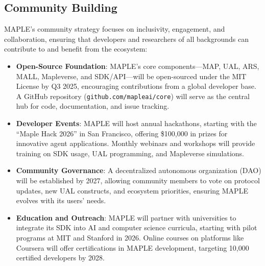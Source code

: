 \documentclass[a4paper,11pt]{article}
\begin{document}
\subsection{Community Building}
MAPLE’s community strategy focuses on inclusivity, engagement, and collaboration, ensuring that developers and researchers of all backgrounds can contribute to and benefit from the ecosystem:
\begin{itemize}[leftmargin=*]
    \item \textbf{Open-Source Foundation}: MAPLE’s core components—MAP, UAL, ARS, MALL, Mapleverse, and SDK/API—will be open-sourced under the MIT License by Q3 2025, encouraging contributions from a global developer base. A GitHub repository (\texttt{github.com/mapleai/core}) will serve as the central hub for code, documentation, and issue tracking.
    \item \textbf{Developer Events}: MAPLE will host annual hackathons, starting with the “Maple Hack 2026” in San Francisco, offering \$100,000 in prizes for innovative agent applications. Monthly webinars and workshops will provide training on SDK usage, UAL programming, and Mapleverse simulations.
    \item \textbf{Community Governance}: A decentralized autonomous organization (DAO) will be established by 2027, allowing community members to vote on protocol updates, new UAL constructs, and ecosystem priorities, ensuring MAPLE evolves with its users’ needs.
    \item \textbf{Education and Outreach}: MAPLE will partner with universities to integrate its SDK into AI and computer science curricula, starting with pilot programs at MIT and Stanford in 2026. Online courses on platforms like Coursera will offer certifications in MAPLE development, targeting 10,000 certified developers by 2028.
\end{itemize}
\end{document}
